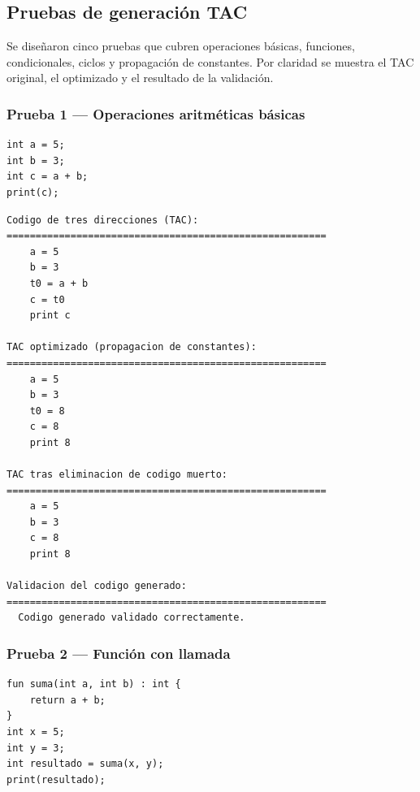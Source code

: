 \documentclass[12pt]{article}
\begin{document}
\subsection{Pruebas de generación TAC}

Se diseñaron cinco pruebas que cubren operaciones básicas,
funciones, condicionales, ciclos y propagación de constantes.
Por claridad se muestra el TAC original, el optimizado y el
resultado de la validación.

\subsubsection{Prueba 1 — Operaciones aritméticas básicas}

\begin{lstlisting}[caption={prueba\_tac\_basica.peka}]
int a = 5;
int b = 3;
int c = a + b;
print(c);
\end{lstlisting}

\begin{lstlisting}[caption={Salida — Prueba 1}]
Codigo de tres direcciones (TAC):
=======================================================
    a = 5
    b = 3
    t0 = a + b
    c = t0
    print c

TAC optimizado (propagacion de constantes):
=======================================================
    a = 5
    b = 3
    t0 = 8
    c = 8
    print 8

TAC tras eliminacion de codigo muerto:
=======================================================
    a = 5
    b = 3
    c = 8
    print 8

Validacion del codigo generado:
=======================================================
  Codigo generado validado correctamente.
\end{lstlisting}

\subsubsection{Prueba 2 — Función con llamada}

\begin{lstlisting}[caption={prueba\_tac\_funcion.peka}]
fun suma(int a, int b) : int {
    return a + b;
}
int x = 5;
int y = 3;
int resultado = suma(x, y);
print(resultado);
\end{lstlisting}
\end{document}
